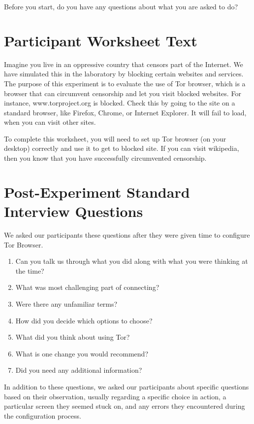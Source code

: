\documentclass[USenglish,oneside,twocolumn]{article}
\begin{document}
Before you start, do you have any questions about what you are asked to do? 

\section{Participant Worksheet Text} 
\label{participant-worksheet}
Imagine you live in an oppressive country that censors part of the Internet. We have simulated this in the laboratory by blocking certain websites and services. The purpose of this experiment is to evaluate the use of Tor browser, which is a browser that can circumvent censorship and let you visit blocked websites. For instance, www.torproject.org is blocked. Check this by going to the site on a standard browser, like Firefox, Chrome, or Internet Explorer. It will fail to load, when you can visit other sites.

To complete this worksheet, you will need to set up Tor browser (on your desktop) correctly and use it to get to blocked site. If you can visit wikipedia, then you know that you have successfully circumvented censorship.

\section{Post-Experiment Standard Interview Questions}
\label{interview-questions}
We asked our participants these questions after they were given time to configure Tor Browser. \\

\begin{enumerate}
\item{Can you talk us through what you did along with what you were thinking at the time?}
\item{What was most challenging part of connecting?}
\item{Were there any unfamiliar terms?}
\item{How did you decide which options to choose?}
\item{What did you think about using Tor?}
\item{What is one change you would recommend?} 
\item{Did you need any additional information?} 
\end{enumerate}  

In addition to these questions, we asked our participants about specific questions based on their observation, usually regarding a specific choice in action, a particular screen they seemed stuck on, and any errors they encountered during the configuration process. 
\end{document}
